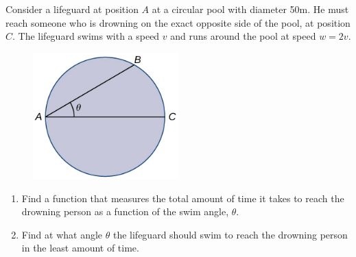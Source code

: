 \documentclass[12pt]{amsart}
\begin{document}
\newpage

\begin{problem}[20 points]
Consider a lifeguard at position $A$ at a circular pool with diameter  50m.
He must reach someone who is drowning on the exact opposite side of the pool, at position  $C$.
The lifeguard swims with a speed  $v$ and runs around the pool at speed  $w= 2v$.

\begin{figure}[ht]
	\begin{center}
		\includegraphics[width=0.5\textwidth]{pool.jpeg}
	\end{center}
\end{figure}
\begin{enumerate}
	\item Find a function that measures the total amount of time it takes to reach the drowning person as a function of the swim angle,  $\theta$.
	      \vspace{7cm}
	\item Find at what angle  $\theta$ the lifeguard should swim to reach the drowning person in the least amount of time.
\end{enumerate}

\end{problem}
\end{document}
